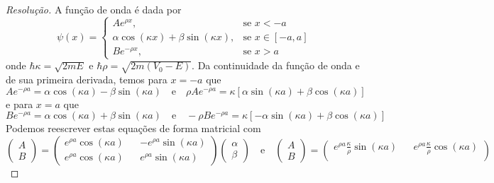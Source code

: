 \begin{proof}[Resolução]
    A função de onda é dada por
    \begin{equation*}
        \psi(x) = \begin{cases}
            Ae^{\rho x},&\text{se }x < -a\\
            \alpha\cos(\kappa x) + \beta\sin(\kappa x),&\text{se }x \in [-a,a]\\
            Be^{-\rho x},&\text{se }x > a
        \end{cases}
    \end{equation*}
    onde \(\hbar \kappa = \sqrt{2 m E}\) e \(\hbar \rho = \sqrt{2m(V_0 - E)}\). Da continuidade da função de onda e de sua primeira derivada, temos para \(x = -a\) que
    \begin{equation*}
        A e^{-\rho a} = \alpha \cos(\kappa a) - \beta \sin(\kappa a)
        \quad\text{e}\quad
        \rho A e^{-\rho a} = \kappa \left[\alpha \sin(\kappa a) + \beta \cos(\kappa a)\right]
    \end{equation*}
    e para \(x = a\) que
    \begin{equation*}
        B e^{-\rho a} = \alpha \cos(\kappa a) + \beta \sin(\kappa a)
        \quad\text{e}\quad
        -\rho Be^{-\rho a} = \kappa\left[-\alpha\sin(\kappa a) + \beta \cos(\kappa a)\right]
    \end{equation*}
    Podemos reescrever estas equações de forma matricial com
    \begin{equation*}
        \begin{pmatrix}
            A\\
            B
        \end{pmatrix} =
        \begin{pmatrix}
            e^{\rho a} \cos(\kappa a) && -e^{\rho a} \sin(\kappa a)\\
            e^{\rho a} \cos(\kappa a) && e^{\rho a} \sin(\kappa a)
        \end{pmatrix}
        \begin{pmatrix}
            \alpha\\
            \beta
        \end{pmatrix}
        \quad\text{e}\quad
        \begin{pmatrix}
            A\\
            B
        \end{pmatrix} =
        \begin{pmatrix}
            e^{\rho a} \frac{\kappa}{\rho}\sin(\kappa a) && e^{\rho a}\frac{\kappa}{\rho}\cos(\kappa a)\\

\end{pmatrix}
\end{equation*}
\end{proof}
